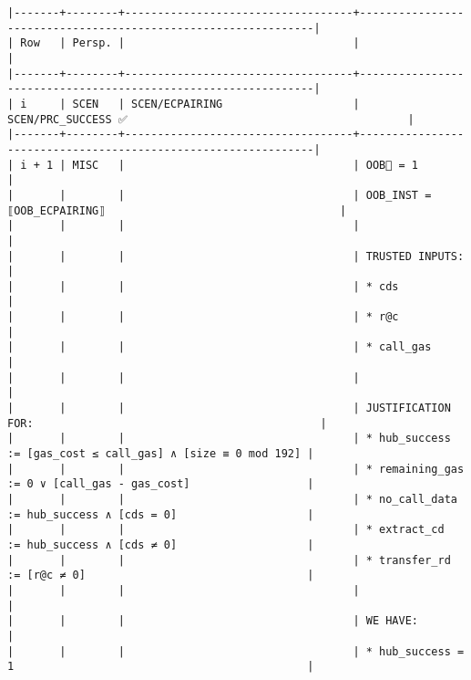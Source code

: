 \documentclass[varwidth=\maxdimen,margin=0.5cm,multi={verbatim}]{standalone}
\begin{document}
\begin{verbatim}
|-------+--------+-----------------------------------+---------------------------------------------------------------|
| Row   | Persp. |                                   |                                                               |
|-------+--------+-----------------------------------+---------------------------------------------------------------|
| i     | SCEN   | SCEN/ECPAIRING                    | SCEN/PRC_SUCCESS ✅                                           |
|-------+--------+-----------------------------------+---------------------------------------------------------------|
| i + 1 | MISC   |                                   | OOB🏴 = 1                                                     |
|       |        |                                   | OOB_INST = ⟦OOB_ECPAIRING⟧                                    |
|       |        |                                   |                                                               |
|       |        |                                   | TRUSTED INPUTS:                                               |
|       |        |                                   | * cds                                                         |
|       |        |                                   | * r@c                                                         |
|       |        |                                   | * call_gas                                                    |
|       |        |                                   |                                                               |
|       |        |                                   | JUSTIFICATION FOR:                                            |
|       |        |                                   | * hub_success   := [gas_cost ≤ call_gas] ∧ [size ≡ 0 mod 192] |
|       |        |                                   | * remaining_gas := 0 ∨ [call_gas - gas_cost]                  |
|       |        |                                   | * no_call_data  := hub_success ∧ [cds = 0]                    |
|       |        |                                   | * extract_cd    := hub_success ∧ [cds ≠ 0]                    |
|       |        |                                   | * transfer_rd   := [r@c ≠ 0]                                  |
|       |        |                                   |                                                               |
|       |        |                                   | WE HAVE:                                                      |
|       |        |                                   | * hub_success = 1                                             |

\end{verbatim}
\end{document}
